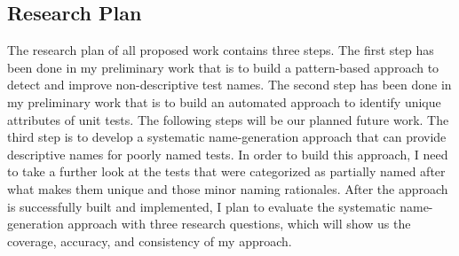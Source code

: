 \subsection{Research Plan}

The research plan of all proposed work contains three steps.
%
The first step has been done in my preliminary work that is to build a pattern-based approach to detect and improve non-descriptive test names.
%
The second step has been done in my preliminary work that is to build an automated approach to identify unique attributes of unit tests.
%
The following steps will be our planned future work.
%
The third step is to develop a systematic name-generation approach that can provide descriptive names for poorly named tests.
%
In order to build this approach, I need to take a further look at the tests that were categorized as partially named after what makes them unique and those minor naming rationales.
%
After the approach is successfully built and implemented, I plan to evaluate the systematic name-generation approach with three research questions, which will show us the coverage, accuracy, and consistency of my approach.
